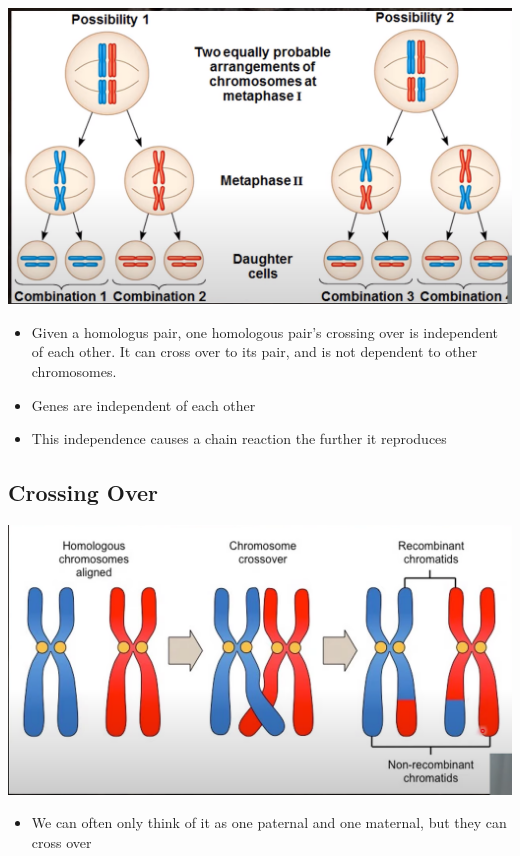 \documentclass{article}
\begin{document}
\includegraphics*[scale=0.45]{ia.png}
\begin{itemize}
    \item Given a homologus pair, one homologous pair's crossing over is independent of each other. It can cross over to its pair, and is not dependent to other chromosomes.
    \item Genes are independent of each other
    \item This independence causes a chain reaction the further it reproduces
\end{itemize} 

\subsection*{Crossing Over}


\includegraphics*[scale=0.45]{co.png}
\begin{itemize}
    \item We can often only think of it as one paternal and one maternal, but they can cross over
\end{itemize}
\end{document}
